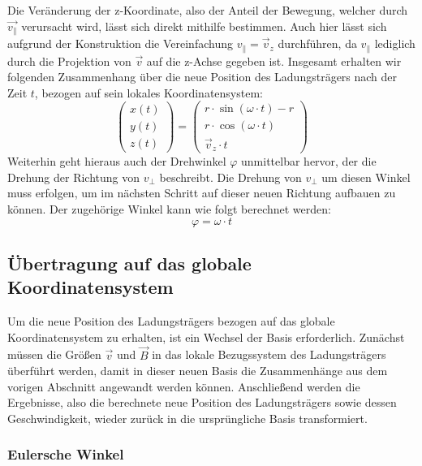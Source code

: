 Die Ver\"anderung der z-Koordinate, also der Anteil der Bewegung, welcher durch \(\vec{v_\parallel}\) verursacht wird, l\"asst sich
direkt mithilfe  bestimmen. Auch hier l\"asst sich aufgrund der Konstruktion die Vereinfachung
\(v_\parallel = \vec{v}_z\) durchf\"uhren, da \(v_\parallel\) lediglich durch die Projektion von \(\vec{v}\) auf die z-Achse gegeben ist.
Insgesamt erhalten wir folgenden Zusammenhang \"uber die neue Position des
Ladungstr\"agers nach der Zeit \(t\), bezogen auf sein lokales Koordinatensystem:
\begin{equation}
  \begin{pmatrix}
    x(t) \\
    y(t) \\
    z(t)
  \end{pmatrix}
  =
  \begin{pmatrix}
    r \cdot \sin{\left(\omega \cdot t\right)} - r \\
    r \cdot \cos{\left(\omega \cdot t\right)} \\
    \vec{v}_z \cdot t
  \end{pmatrix}
\end{equation}
Weiterhin geht hieraus auch der Drehwinkel \(\varphi\) unmittelbar hervor, der die Drehung der Richtung von \(v_\perp\)
beschreibt. Die Drehung von \(v_\perp\) um diesen Winkel muss erfolgen, um im n\"achsten Schritt auf dieser neuen Richtung aufbauen
zu k\"onnen. Der zugeh\"orige Winkel kann wie folgt berechnet werden:
\begin{equation}
  \label{eq:phi}
  \varphi = \omega \cdot t
\end{equation}

\subsection{\"Ubertragung auf das globale Koordinatensystem}

Um die neue Position des Ladungstr\"agers bezogen auf das globale Koordinatensystem zu erhalten, ist ein Wechsel der Basis erforderlich.
Zun\"achst m\"ussen die Gr\"o{\ss}en \(\vec{v}\) und \(\vec{B}\) in das lokale Bezugssystem des Ladungstr\"agers \"uberf\"uhrt werden,
damit in dieser neuen Basis die Zusammenh\"ange aus dem vorigen Abschnitt angewandt werden k\"onnen. Anschlie{\ss}end werden
die Ergebnisse, also die berechnete neue Position des Ladungstr\"agers sowie dessen Geschwindigkeit, wieder zur\"uck in die
urspr\"ungliche Basis transformiert.

\subsubsection{Eulersche Winkel}

